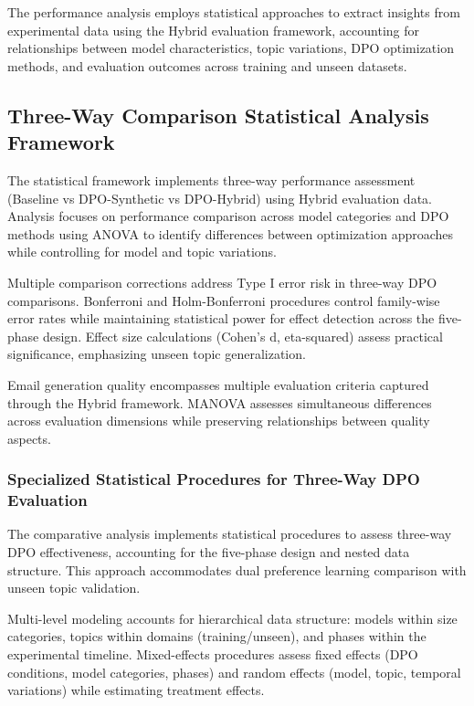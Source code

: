 The performance analysis employs statistical approaches to extract insights from experimental data using the Hybrid evaluation framework, accounting for relationships between model characteristics, topic variations, DPO optimization methods, and evaluation outcomes across training and unseen datasets.

\subsection{Three-Way Comparison Statistical Analysis Framework}

The statistical framework implements three-way performance assessment (Baseline vs DPO-Synthetic vs DPO-Hybrid) using Hybrid evaluation data. Analysis focuses on performance comparison across model categories and DPO methods using ANOVA to identify differences between optimization approaches while controlling for model and topic variations.

Multiple comparison corrections address Type I error risk in three-way DPO comparisons. Bonferroni and Holm-Bonferroni procedures control family-wise error rates while maintaining statistical power for effect detection across the five-phase design. Effect size calculations (Cohen's d, eta-squared) assess practical significance, emphasizing unseen topic generalization.

Email generation quality encompasses multiple evaluation criteria captured through the Hybrid framework. MANOVA assesses simultaneous differences across evaluation dimensions while preserving relationships between quality aspects.

\subsubsection{Specialized Statistical Procedures for Three-Way DPO Evaluation}

The comparative analysis implements statistical procedures to assess three-way DPO effectiveness, accounting for the five-phase design and nested data structure. This approach accommodates dual preference learning comparison with unseen topic validation.

Multi-level modeling accounts for hierarchical data structure: models within size categories, topics within domains (training/unseen), and phases within the experimental timeline. Mixed-effects procedures assess fixed effects (DPO conditions, model categories, phases) and random effects (model, topic, temporal variations) while estimating treatment effects.

